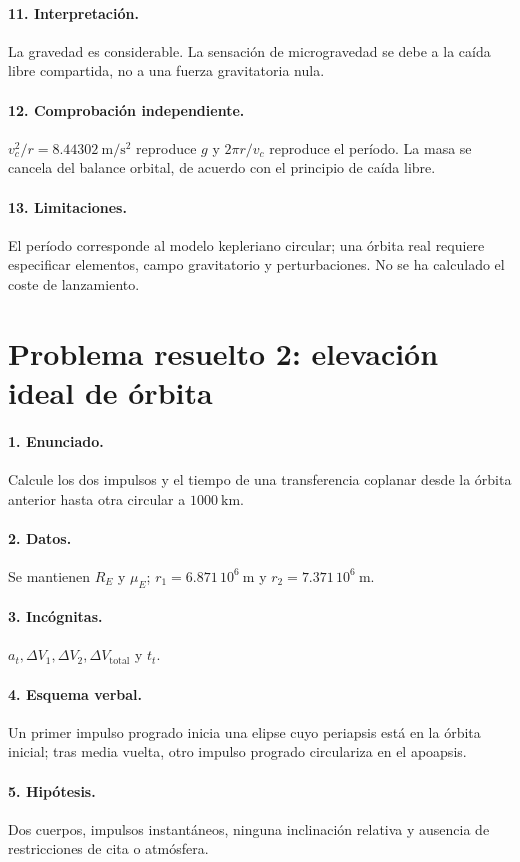 \paragraph{11. Interpretación.} La gravedad es considerable. La sensación de microgravedad se debe a la caída libre compartida, no a una fuerza gravitatoria nula.
\paragraph{12. Comprobación independiente.} $v_c^2/r=8.44302\ \mathrm{m/s^2}$ reproduce $g$ y $2\pi r/v_c$ reproduce el período. La masa se cancela del balance orbital, de acuerdo con el principio de caída libre.
\paragraph{13. Limitaciones.} El período corresponde al modelo kepleriano circular; una órbita real requiere especificar elementos, campo gravitatorio y perturbaciones. No se ha calculado el coste de lanzamiento.

\section{Problema resuelto 2: elevación ideal de órbita}
\paragraph{1. Enunciado.} Calcule los dos impulsos y el tiempo de una transferencia coplanar desde la órbita anterior hasta otra circular a $1000\ \mathrm{km}$.
\paragraph{2. Datos.} Se mantienen $R_E$ y $\mu_E$; $r_1=6.871\,10^6\ \mathrm m$ y $r_2=7.371\,10^6\ \mathrm m$.
\paragraph{3. Incógnitas.} $a_t,\Delta V_1,\Delta V_2,\Delta V_{\mathrm{total}}$ y $t_t$.
\paragraph{4. Esquema verbal.} Un primer impulso progrado inicia una elipse cuyo periapsis está en la órbita inicial; tras media vuelta, otro impulso progrado circulariza en el apoapsis.
\paragraph{5. Hipótesis.} Dos cuerpos, impulsos instantáneos, ninguna inclinación relativa y ausencia de restricciones de cita o atmósfera.

